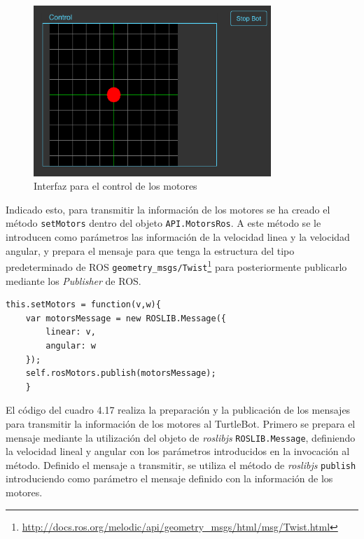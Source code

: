 \begin{figure}[H]
  \begin{center}
    \includegraphics[width=0.8\textwidth]{figures/controlturtle.png}
		\caption{Interfaz para el control de los motores}
		\label{fig.controlturtle}
		\end{center}
\end{figure}

Indicado esto, para transmitir la información de los motores se ha creado el método \texttt{setMotors} dentro del objeto \texttt{API.MotorsRos}. A este método se le introducen como parámetros las información de la velocidad linea y la velocidad angular, y prepara el mensaje para que tenga la estructura del tipo predeterminado de ROS \texttt{geometry\_msgs/Twist}\footnote{\url{http://docs.ros.org/melodic/api/geometry_msgs/html/msg/Twist.html}} para posteriormente publicarlo mediante los \textit{Publisher} de ROS.

\begin{lstlisting}[caption= Preparación y publicación del mensaje con el control de los motores, label=cod.motores]
this.setMotors = function(v,w){
	var motorsMessage = new ROSLIB.Message({
		linear: v,
		angular: w
	});
	self.rosMotors.publish(motorsMessage);
	}
\end{lstlisting}

El código del cuadro 4.17 realiza la preparación y la publicación de los mensajes para transmitir la información de los motores al TurtleBot. Primero se prepara el mensaje mediante la utilización del objeto de \textit{roslibjs} \texttt{ROSLIB.Message}, definiendo la velocidad lineal y angular con los parámetros introducidos en la invocación al método. Definido el mensaje a transmitir, se utiliza el método de \textit{roslibjs} \texttt{publish} introduciendo como parámetro el mensaje definido con la información de los motores.

